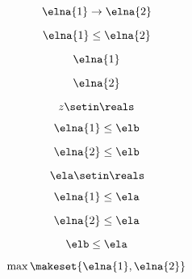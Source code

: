 \begin{forslides}
    \begin{equation}
        \label{eq:parallelism-132}
        \elna{1}\to \elna{2}
    \end{equation}

    \begin{equation}
        \label{eq:parallelism-133}
        \elna{1}\leq \elna{2}
    \end{equation}

    \begin{equation}
        \label{eq:parallelism-134}
        \elna{1}
    \end{equation}

    \begin{equation}
        \label{eq:parallelism-135}
        \elna{2}
    \end{equation}

    \begin{equation}
        \label{eq:parallelism-136}
        z\setin \reals
    \end{equation}

    \begin{equation}
        \label{eq:parallelism-137}
        \elna{1}\leq \elb
    \end{equation}

    \begin{equation}
        \label{eq:parallelism-138}
        \elna{2}\leq \elb
    \end{equation}

    \begin{equation}
        \label{eq:parallelism-139}
        \ela\setin \reals
    \end{equation}

    \begin{equation}
        \label{eq:parallelism-140}
        \elna{1}\leq \ela
    \end{equation}

    \begin{equation}
        \label{eq:parallelism-141}
        \elna{2}\leq \ela
    \end{equation}

    \begin{equation}
        \label{eq:parallelism-142}
        \elb\leq \ela
    \end{equation}

    \begin{equation}
        \label{eq:parallelism-143}
        \max\makeset{\elna{1},\elna{2}}
    \end{equation}


\end{forslides}
